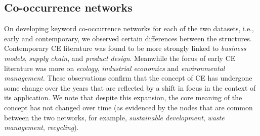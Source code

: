\documentclass[output=paper]{langsci/langscibook}
\begin{document}
\subsection{Co-occurrence networks}
On developing keyword co-occurrence networks for each of the two datasets, i.e., early and contemporary, we observed certain differences between the structures.
Contemporary CE literature was found to be more strongly linked to \emph{business models}, \emph{supply chain}, and \emph{product design}. Meanwhile the focus of early CE literature was more on \emph{ecology}, \emph{industrial economics} and \emph{environmental management}. These observations confirm that the concept of CE has undergone some change over the years that are reflected by a shift in focus in the context of its application. We note that despite this expansion, the core meaning of the concept has not changed over time (as evidenced by the nodes that are common between the two networks, for example, \emph{sustainable development}, \emph{waste management}, \emph{recycling}).
\end{document}
